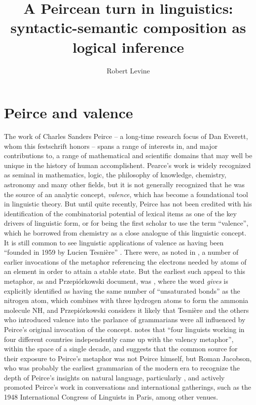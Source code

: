 \documentclass[output=paper,colorlinks,citecolor=brown]{langscibook}
\title{A Peircean turn in linguistics: syntactic-semantic composition as logical inference}
\author{Robert Levine\affiliation{Ohio State University}}
\begin{document}
\maketitle
\providecommand{\SetInfLen}{\relax}


\section{Peirce and valence}

The work of Charles Sanders Peirce -- a long-time research focus of Dan
Everett, whom this festschrift honors -- spans a range of interests in,
and major contributions to, a range of mathematical and scientific
domains that may well be unique in the history of human
accomplishent. Pearce's work is widely recognized as seminal in
mathematics, logic, the philosophy of knowledge, chemistry, astronomy
and many other fields, but it is not generally recognized that he was
the source of an analytic concept, \textsl{valence}, which has become
a foundational tool in linguistic theory. But until quite recently,
Peirce has not been credited with his identification of the
combinatorial potential of lexical items as one of the key drivers of
linguistic form, or for being the first scholar to use the term
``valence'', which he borrowed from chemistry as a close analogue of
this linguistic concept. It is still common to see linguistic
applications of valence as having been ``founded in 1959 by Lucien
Tesnière'' \citet{hollein2022}. There were, as noted in \citet{AdamP-Peirce}, a
number of earlier invocations of the metaphor referencing the
electrons needed by atoms of an element in order to attain a stable
state. But the earliest such appeal to this metaphor, as \citet{askedal91}
and Przepi\'{o}rkowski document, was \citet{peirce1897}, where the word
\textit{gives} is explicitly identified as having the same number of
``unsaturated bonds'' as the nitrogen atom, which combines with three
hydrogen atoms to form the ammonia molecule NH, and
Przepi{\'o}rkowski considers it likely that Tesnière and the
others who introduced valence into the parlance of grammarians were
all influenced by Peirce's original invocation of the
concept. \citet[155]{AdamP-Peirce} notes that ``four linguists working
in four different countries independently came up with the valency
metaphor'', within the space of a single decade, and suggests that the
common source for their exposure to Peirce's metaphor was not Peirce
himself, but Roman Jacobson, who was probably the earliest
grammarian of the modern era to recognize the depth of Peirce's
insights on natural language, particularly \citet{peirce1897}, and actively
promoted Peirce's work in conversations and international gatherings,
such as the 1948 International Congress of Linguists in Paris, among
other venues.
\end{document}
